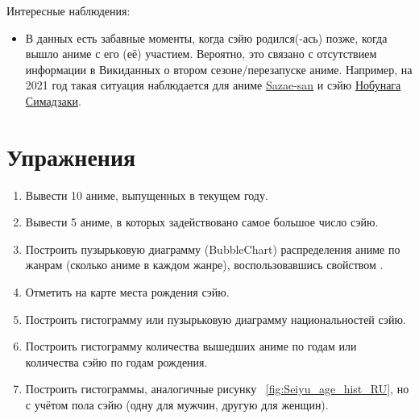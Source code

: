 Интересные наблюдения:
\begin{itemize}
    \item В данных есть забавные моменты, когда сэйю родился(-ась) позже, когда вышло аниме с его (её) участием. Вероятно, это связано с отсутствием информации в Викиданных о втором сезоне/перезапуске аниме. Например, на 2021 год такая ситуация наблюдается для аниме \href{https://www.wikidata.org/wiki/Q11304591}{Sazae-san} и сэйю \href{https://www.wikidata.org/wiki/Q5968283}{Нобунага Симадзаки}.
\end{itemize}

\section{Упражнения}

\begin{enumerate}
    \item Вывести 10 аниме, выпущенных в текущем году.
    \item Вывести 5 аниме, в которых задействовано самое большое число сэйю.
    \item Построить пузырьковую диаграмму (BubbleChart) распределения аниме по жанрам (сколько аниме в каждом жанре), воспользовавшись свойством .
    \item Отметить на карте места рождения сэйю.
    \item Построить гистограмму или пузырьковую диаграмму национальностей сэйю.
    \item Построить гистограмму количества вышедших аниме по годам или количества сэйю по годам рождения.
    \item Построить гистограммы, аналогичные рисунку ~\ref{fig:Seiyu_age_hist_RU}, но с учётом пола сэйю (одну для мужчин, другую для женщин).
\end{enumerate}
